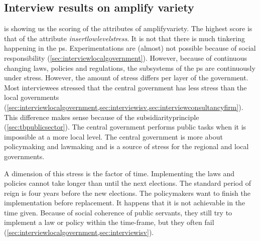 \subsection{Interview results on amplify variety}
\label{sub:interviewresultsamplify}
 is showing us the scoring of the \glspl{attribute} of \gls{amplifyvariety}. The highest score is that of the \gls{attribute} \textit{\gls{insertlowlevelstress}}. It is not that there is much tinkering happening in the \gls{ps}. Experimentations are (almost) not possible because of social responsibility (\cref{sec:interviewlocalgovernment}). However, because of continuous changing laws, policies and regulations, the subsystems of the \gls{ps} are continuously under stress. However, the amount of stress differs per layer of the government. Most interviewees stressed that the central government has less stress than the local governments (\cref{sec:interviewlocalgovernment,sec:interviewisv,sec:interviewconsultancyfirm}). This difference makes sense because of the \gls{subsidiarityprinciple} (\cref{sec:tbpublicsector}). The central government performs public tasks when it is impossible at a more local level. The central government is more about policymaking and lawmaking and is a source of stress for the regional and local governments. 

A dimension of this stress is the factor of time. Implementing the laws and policies cannot take longer than until the next elections. The standard period of reign is four years before the new elections. The policymakers want to finish the implementation before replacement. It happens that it is not achievable in the time given. Because of social coherence of public servants, they still try to implement a law or policy within the time-frame, but they often fail (\cref{sec:interviewlocalgovernment,sec:interviewisv}).

